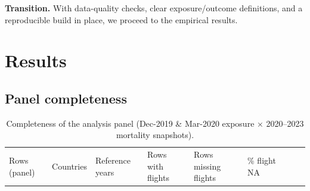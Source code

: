 \documentclass[
  authoryear,
  preprint,
  3p,
  onecolumn]{elsarticle}
\begin{document}
\textbf{Transition.} With data-quality checks, clear exposure/outcome
definitions, and a reproducible build in place, we proceed to the
empirical results.

\section{Results}\label{results}

\subsection{Panel completeness}\label{complete-panel}

\begin{longtable}[]{@{}
  >{\raggedleft\arraybackslash}p{}
  >{\raggedleft\arraybackslash}p{}
  >{\raggedleft\arraybackslash}p{}
  >{\raggedleft\arraybackslash}p{}
  >{\raggedleft\arraybackslash}p{}
  >{\raggedright\arraybackslash}p{}
  >{\raggedleft\arraybackslash}p{}
  >{\raggedleft\arraybackslash}p{}
  >{\raggedright\arraybackslash}p{}@{}}
\caption{Completeness of the analysis panel (Dec-2019 \& Mar-2020
exposure × 2020--2023 mortality snapshots).}\tabularnewline
\toprule\noalign{}
\begin{minipage}[b]{\linewidth}\raggedleft
Rows (panel)
\end{minipage} & \begin{minipage}[b]{\linewidth}\raggedleft
Countries
\end{minipage} & \begin{minipage}[b]{\linewidth}\raggedleft
Reference years
\end{minipage} & \begin{minipage}[b]{\linewidth}\raggedleft
Rows with flights
\end{minipage} & \begin{minipage}[b]{\linewidth}\raggedleft
Rows missing flights
\end{minipage} & \begin{minipage}[b]{\linewidth}\raggedright
\% flight NA
\end{minipage} & \begin{minipage}[b]{\linewidth}\raggedleft

\end{minipage}
\end{longtable}
\end{document}

